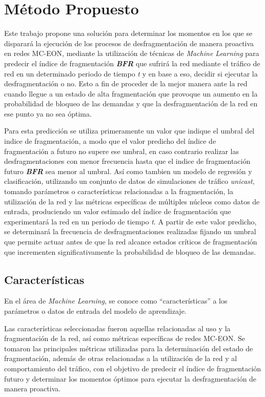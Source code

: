 \chapter{ Método Propuesto }
Este trabajo propone una solución para determinar los momentos en los que se disparará la ejecución de los procesos de desfragmentación de manera proactiva en redes MC-EON, mediante la utilización de técnicas de \textit{Machine Learning} para predecir el índice de fragmentación \textit{\textbf{BFR}} que sufrirá la red mediante el tráfico de red en un determinado periodo de tiempo \textit{t} y en base a eso, decidir si ejecutar la desfragmentación o no.
 Esto a fin de proceder de la mejor manera ante la red cuando llegue a un estado de alta fragmentación que provoque un aumento en la probabilidad de bloqueo de las demandas y que la desfragmentación de la red en ese punto ya no sea óptima.
%

Para esta predicción se utiliza primeramente un valor que indique el umbral del indice de fragmentación, a modo que el valor predicho del índice de fragmentación a futuro no supere ese umbral, en caso contrario realizar las desfragmentaciones con menor frecuencia hasta que el indice de fragmentación futuro \textit{\textbf{BFR}} sea menor al umbral.
 Así como tambien un modelo de regresión y clasificación, utilizando un conjunto de datos de simulaciones de tráfico \textit{unicast}, tomando parámetros o características relacionadas a la fragmentación, la utilización de la red y las métricas específicas de múltiples núcleos como datos de entrada, produciendo un valor estimado del índice de fragmentación que experimentará la red en un periodo de tiempo \textit{t}.
  A partir de este valor predicho, se determinará la frecuencia de desfragmentaciones realizadas fijando un umbral que permite actuar antes de que la red alcance estados críticos de fragmentación que incrementen significativamente la probabilidad de bloqueo de las demandas.
%

\section{Características}

En el área de \textit{Machine Learning}, se conoce como ``características'' a los parámetros o datos de entrada del modelo de aprendizaje.

Las características seleccionadas fueron aquellas relacionadas al uso y la fragmentación de la red, así como métricas específicas de redes MC-EON. Se tomaron las principales métricas utilizadas para la determinación del estado de fragmentación, además de otras relacionadas a la utilización de la red y al comportamiento del tráfico, con el objetivo de predecir el índice de fragmentación futuro y determinar los momentos óptimos para ejecutar la desfragmentación de manera proactiva.

